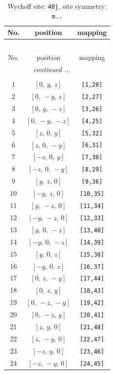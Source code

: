\documentclass[fleqn,8pt]{jsarticle}
\begin{document}
\begin{longtable}{ccc}
\caption{Wyckoff site: {\tt 48j}, site symmetry: {\tt m..}}
 \\
 \hline \hline
No. & position & mapping \\ \hline \endfirsthead

\multicolumn{2}{l}{\tablename\ \thetable{}} \\
 \hline \hline
No. & position & mapping \\ \hline \endhead

 \hline \hline
\multicolumn{2}{r}{\footnotesize\it continued ...} \\ \endfoot

 \hline \hline
\multicolumn{2}{r}{} \\ \endlastfoot

1 & $\left[ 0,\, y,\, z \right]$ & {\tt [1,28]} \\ \hline
2 & $\left[ 0,\, - y,\, z \right]$ & {\tt [2,27]} \\ \hline
3 & $\left[ 0,\, y,\, - z \right]$ & {\tt [3,26]} \\ \hline
4 & $\left[ 0,\, - y,\, - z \right]$ & {\tt [4,25]} \\ \hline
5 & $\left[ z,\, 0,\, y \right]$ & {\tt [5,32]} \\ \hline
6 & $\left[ z,\, 0,\, - y \right]$ & {\tt [6,31]} \\ \hline
7 & $\left[ - z,\, 0,\, y \right]$ & {\tt [7,30]} \\ \hline
8 & $\left[ - z,\, 0,\, - y \right]$ & {\tt [8,29]} \\ \hline
9 & $\left[ y,\, z,\, 0 \right]$ & {\tt [9,36]} \\ \hline
10 & $\left[ - y,\, z,\, 0 \right]$ & {\tt [10,35]} \\ \hline
11 & $\left[ y,\, - z,\, 0 \right]$ & {\tt [11,34]} \\ \hline
12 & $\left[ - y,\, - z,\, 0 \right]$ & {\tt [12,33]} \\ \hline
13 & $\left[ y,\, 0,\, - z \right]$ & {\tt [13,40]} \\ \hline
14 & $\left[ - y,\, 0,\, - z \right]$ & {\tt [14,39]} \\ \hline
15 & $\left[ y,\, 0,\, z \right]$ & {\tt [15,38]} \\ \hline
16 & $\left[ - y,\, 0,\, z \right]$ & {\tt [16,37]} \\ \hline
17 & $\left[ 0,\, z,\, - y \right]$ & {\tt [17,44]} \\ \hline
18 & $\left[ 0,\, z,\, y \right]$ & {\tt [18,43]} \\ \hline
19 & $\left[ 0,\, - z,\, - y \right]$ & {\tt [19,42]} \\ \hline
20 & $\left[ 0,\, - z,\, y \right]$ & {\tt [20,41]} \\ \hline
21 & $\left[ z,\, y,\, 0 \right]$ & {\tt [21,48]} \\ \hline
22 & $\left[ z,\, - y,\, 0 \right]$ & {\tt [22,47]} \\ \hline
23 & $\left[ - z,\, y,\, 0 \right]$ & {\tt [23,46]} \\ \hline
24 & $\left[ - z,\, - y,\, 0 \right]$ & {\tt [24,45]} \\
\end{longtable}
\end{document}
